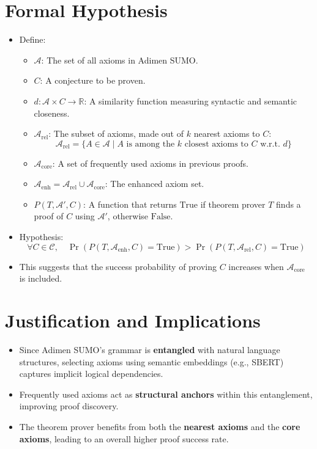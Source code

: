 \documentclass[english,version-2020-11]{uzl-thesis}
\begin{document}
  \section{Formal Hypothesis}
    \begin{itemize}
        \item Define:
        \begin{itemize}
            \item $\mathcal{A}$: The set of all axioms in Adimen SUMO.
            \item $C$: A conjecture to be proven.
            \item $d: \mathcal{A} \times C \to \mathbb{R}$: A similarity function measuring syntactic and semantic closeness.
            \item $\mathcal{A}_{\text{rel}}$: The subset of axioms, made out of $k$ nearest axioms to $C$:
            \begin{equation}
                \mathcal{A}_{\text{rel}} = \{ A \in \mathcal{A} \mid A \text{ is among the } k \text{ closest axioms to } C \text{ w.r.t. } d \}
            \end{equation}
            \item $\mathcal{A}_{\text{core}}$: A set of frequently used axioms in previous proofs.
            \item $\mathcal{A}_{\text{enh}} = \mathcal{A}_{\text{rel}} \cup \mathcal{A}_{\text{core}}$: The enhanced axiom set.
            \item $P(T, \mathcal{A}', C)$: A function that returns $\text{True}$ if theorem prover $T$ finds a proof of $C$ using $\mathcal{A}'$, otherwise $\text{False}$.
        \end{itemize}
        \item Hypothesis:
        \begin{equation}
            \forall C \in \mathcal{C}, \quad \Pr(P(T, \mathcal{A}_{\text{enh}}, C) = \text{True}) > \Pr(P(T, \mathcal{A}_{\text{rel}}, C) = \text{True})
        \end{equation}
        \item This suggests that the success probability of proving $C$ increases when $\mathcal{A}_{\text{core}}$ is included.
    \end{itemize}

  \section{Justification and Implications}
    \begin{itemize}
        \item Since Adimen SUMO’s grammar is \textbf{entangled} with natural language structures, selecting axioms using semantic embeddings (e.g., SBERT) captures implicit logical dependencies.
        \item Frequently used axioms act as \textbf{structural anchors} within this entanglement, improving proof discovery.
        \item The theorem prover benefits from both the \textbf{nearest axioms} and the \textbf{core axioms}, leading to an overall higher proof success rate.
    \end{itemize}
\end{document}
